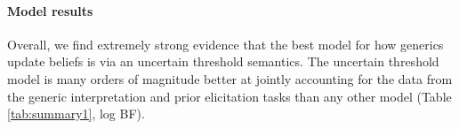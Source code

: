 \documentclass[floatsintext,man]{apa6}
\let\oldparagraph\paragraph
\renewcommand{\paragraph}[1]{\oldparagraph{#1}\mbox{}}
\begin{document}
\hypertarget{model-criticism}{%
\paragraph{Model results}\label{model-criticism}}
%
Overall, we find extremely strong evidence that the best model for how generics update beliefs is via an uncertain threshold semantics. 
The uncertain threshold model is many orders of magnitude better at jointly accounting for the data from the generic interpretation and prior elicitation tasks than any other model (Table \ref{tab:summary1}, log BF). 

\end{document}

